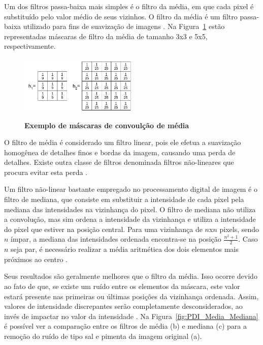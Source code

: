 \documentclass[12pt,oneside,a4paper,english,french,spanish,brazil,]{abntex2}
\begin{document}
Um dos filtros passa-baixa mais simples é o filtro da média, em que cada pixel é substituído pelo valor médio de seus vizinhos. O filtro da média é um filtro passa-baixa utilizado para fins de suavização de imagens \cite{pedrini:2008}. Na Figura~\ref{fig:PDI_Mascara_Media} estão representadas máscaras de filtro da média de tamanho 3x3 e 5x5, respectivamente.

\begin{figure}[ht]
\centering
\caption{\textbf{Exemplo de máscaras de convoulção de média}}
\includegraphics[width=0.5\textwidth]{imagens/PDI_Mascara_Media.pdf}
\label{fig:PDI_Mascara_Media}
\end{figure}

O filtro de média é considerado um filtro linear, pois ele efetua a suavização homogênea de detalhes finos e bordas da imagem, causando uma perda de detalhes. Existe outra classe de filtros denominada filtros não-lineares que procura evitar esta perda \cite{pedrini:2008}.

Um filtro não-linear bastante empregado no processamento digital de imagem é o filtro de mediana, que consiste em substituir a intensidade de cada pixel pela mediana das intensidades na vizinhança do pixel. O filtro de mediana não utiliza a convolução, mas sim ordena a intensidade da vizinhança e utiliza a intensidade do pixel que estiver na posição central. Para uma vizinhança de \(n\)x\(n\) pixels, sendo \(n\) ímpar, a mediana das intensidades ordenada encontra-se na posição \(\frac{n^2+1}{2}\). Caso \(n\) seja par, é necessário realizar a média aritmética dos dois elementos mais próximos ao centro \cite{gonzalez:2012}. 

Seus resultados são geralmente melhores que o filtro da média. Isso ocorre devido ao fato de que, se existe um ruído entre os elementos da máscara, este valor estará presente nas primeiras ou últimas posições da vizinhança ordenada. Assim, valores de intensidade discrepantes serão completamente desconsiderados, ao invés de impactar no valor da intensidade \cite{conci:2003}. Na Figura~\ref{fig:PDI_Media_Mediana} é possível ver a comparação entre os filtros de média (b) e mediana (c) para a remoção do ruído de tipo sal e pimenta da imagem original (a).
\end{document}
